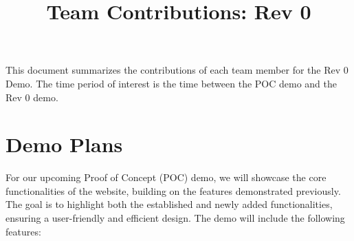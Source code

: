 \documentclass{article}
\title{Team Contributions: Rev 0\\\progname}
\author{\authname}
\date{}
\begin{document}
\maketitle

This document summarizes the contributions of each team member for the Rev 0
Demo.  The time period of interest is the time between the POC demo and the Rev
0 demo.

\section{Demo Plans}

For our upcoming Proof of Concept (POC) demo, we will showcase the core functionalities of the website, building on the features demonstrated previously. The goal is to highlight both the established and newly added functionalities, ensuring a user-friendly and efficient design. The demo will include the following features:
\end{document}
